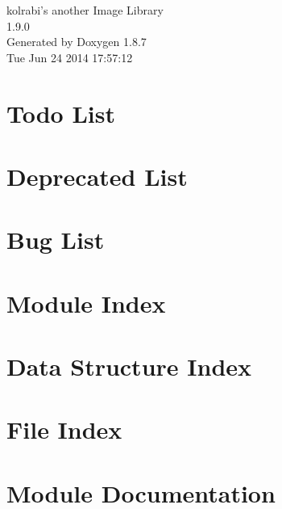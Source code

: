 \documentclass[twoside]{book}
\newcommand{\+}{\discretionary{\mbox{\scriptsize$\hookleftarrow$}}{}{}}
\newcommand{\clearemptydoublepage}{%
  \newpage{\pagestyle{empty}\cleardoublepage}%
}
\begin{document}
\hypersetup{pageanchor=false,
             bookmarks=true,
             bookmarksnumbered=true,
             pdfencoding=unicode
            }
\begin{titlepage}
\vspace*{7cm}
\begin{center}%
{\Large kolrabi's another Image Library \\[1ex]\large 1.\+9.\+0 }\\
\vspace*{1cm}
{\large Generated by Doxygen 1.8.7}\\
\vspace*{0.5cm}
{\small Tue Jun 24 2014 17:57:12}\\
\end{center}
\end{titlepage}
\clearemptydoublepage
\tableofcontents
\clearemptydoublepage
{}
\hypersetup{pageanchor=true}

\chapter{Todo List}
\label{dd/da0/todo}
\hypertarget{dd/da0/todo}{}

\chapter{Deprecated List}
\label{da/d58/deprecated}
\hypertarget{da/d58/deprecated}{}

\chapter{Bug List}
\label{de/da5/bug}
\hypertarget{de/da5/bug}{}

\chapter{Module Index}

\chapter{Data Structure Index}

\chapter{File Index}

\chapter{Module Documentation}





















\end{document}
